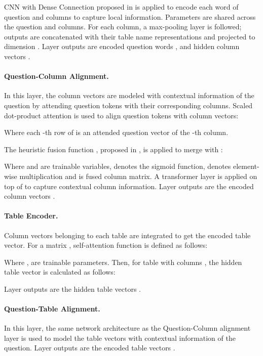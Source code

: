 \documentclass[11pt,a4paper]{article}
\begin{document}
CNN with Dense Connection proposed in \citet{Yoon18} is applied to encode each word of question and columns to capture local information. Parameters are shared across the question and columns. For each column, a max-pooling layer is followed; outputs are concatenated with their table name representations and projected to dimension . Layer outputs are encoded question words , and hidden column vectors .

\paragraph{Question-Column Alignment.} In this layer, the column vectors are modeled with contextual information of the question by attending question tokens with their corresponding columns. Scaled dot-product attention \citep{transformer} is used to align question tokens with column vectors:



Where each -th row of  is an attended question vector of the -th column.

The heuristic fusion function , proposed in \citet{mnemonic}, is applied to merge  with :


Where  and  are trainable variables,  denotes the sigmoid function,   denotes element-wise multiplication and  is fused column matrix. A transformer layer \citep{transformer} is applied on top of  to capture contextual column information. Layer outputs are the encoded column vectors .

\paragraph{Table Encoder.} Column vectors belonging to each table are integrated to get the encoded table vector. For a matrix , self-attention function  is defined as follows:



Where ,  are trainable parameters. Then, for table  with columns , the hidden table vector  is calculated as follows:



Layer outputs are the hidden table vectors .

\paragraph{Question-Table Alignment.} In this layer, the same network architecture as the Question-Column alignment layer is used to model the table vectors with contextual information of the question. Layer outputs are the encoded table vectors .
\end{document}
